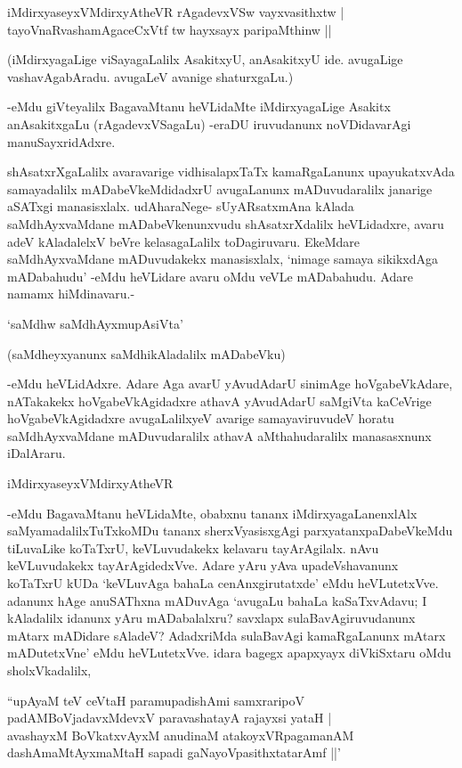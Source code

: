 \begin{shloka}
iMdirxyaseyxVMdirxyAtheVR rAgadevxVSw vayxvasithxtw |\\
tayoVnaRvashamAgaceCxVtf tw hayxsayx paripaMthinw ||
\end{shloka}

(iMdirxyagaLige viSayagaLalilx AsakitxyU, anAsakitxyU ide. avugaLige vashavAgabAradu. avugaLeV avanige shaturxgaLu.)

-eMdu giVteyalilx BagavaMtanu heVLidaMte iMdirxyagaLige Asakitx anAsakitxgaLu (rAgadevxVSagaLu) -eraDU iruvudanunx noVDidavarAgi manuSayxridAdxre.

shAsatxrXgaLalilx avaravarige vidhisalapxTaTx kamaRgaLanunx upayukatxvAda samayadalilx mADabeVkeMdidadxrU avugaLanunx mADuvudaralilx janarige aSATxgi manasisxlalx. udAharaNege- sUyARsatxmAna kAlada saMdhAyxvaMdane mADabeVkenunxvudu shAsatxrXdalilx heVLidadxre, avaru adeV kAladalelxV beVre kelasagaLalilx toDagiruvaru. EkeMdare saMdhAyxvaMdane mADuvudakekx manasisxlalx, `nimage samaya sikikxdAga mADabahudu' -eMdu heVLidare avaru oMdu veVLe mADabahudu. Adare namamx hiMdinavaru.-

\begin{shloka}
`saMdhw saMdhAyxmupAsiVta'
\end{shloka}

(saMdheyxyanunx saMdhikAladalilx mADabeVku)

-eMdu heVLidAdxre. Adare Aga avarU yAvudAdarU sinimAge hoVgabeVkAdare, nATakakekx hoVgabeVkAgidadxre athavA yAvudAdarU saMgiVta kaCeVrige hoVgabeVkAgidadxre avugaLalilxyeV avarige samayaviruvudeV horatu saMdhAyxvaMdane mADuvudaralilx athavA aMthahudaralilx manasasxnunx iDalAraru.

\begin{shloka}
iMdirxyaseyxVMdirxyAtheVR
\end{shloka}

-eMdu BagavaMtanu heVLidaMte, obabxnu tananx iMdirxyagaLanenxlAlx saMyamadalilxTuTxkoMDu tananx sherxVyasisxgAgi parxyatanxpaDabeVkeMdu tiLuvaLike koTaTxrU, keVLuvudakekx kelavaru tayArAgilalx. nAvu keVLuvudakekx tayArAgidedxVve. Adare yAru yAva upadeVshavanunx koTaTxrU kUDa `keVLuvAga bahaLa cenAnxgirutatxde' eMdu heVLutetxVve. adanunx hAge anuSAThxna mADuvAga `avugaLu bahaLa kaSaTxvAdavu; I kAladalilx idanunx yAru mADabalalxru? savxlapx sulaBavAgiruvudanunx mAtarx mADidare sAladeV? AdadxriMda sulaBavAgi kamaRgaLanunx mAtarx mADutetxVne' eMdu heVLutetxVve. idara bagegx apapxyayx diVkiSxtaru oMdu sholxVkadalilx,

\begin{shloka}
``upAyaM teV ceVtaH paramupadishAmi samxraripoV\\
padAMBoVjadavxMdevxV paravashatayA rajayxsi yataH |\\
avashayxM BoVkatxvAyxM anudinaM atakoyxVR\s pagamanAM\\
dashAmaMtAyxmaMtaH sapadi gaNayoVpasithxtatarAmf ||'
\end{shloka}

